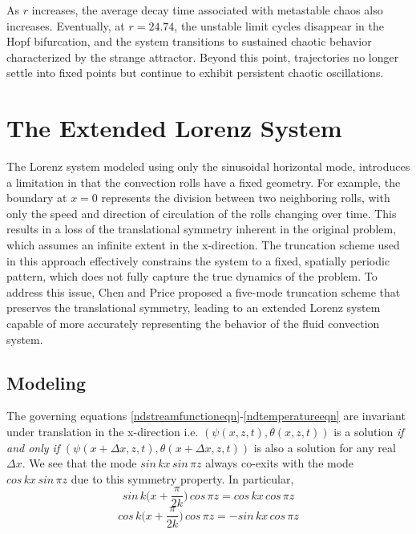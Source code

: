 \documentclass[paper=a4, fontsize=11pt]{scrartcl}
\numberwithin{equation}{section}		%
\numberwithin{figure}{section}			%
\numberwithin{table}{section}				%
\begin{document}
As $r$ increases, the average decay time associated with metastable chaos also increases. Eventually, at $r=24.74$, the unstable limit cycles disappear in the Hopf bifurcation, and the system transitions to sustained chaotic behavior characterized by the strange attractor. Beyond this point, trajectories no longer settle into fixed points but continue to exhibit persistent chaotic oscillations.

\section{The Extended Lorenz System}
The Lorenz system modeled using only the sinusoidal horizontal mode, introduces a limitation in that the convection rolls have a fixed geometry. For example, the boundary at $x=0$ represents the division between two neighboring rolls, with only the speed and direction of circulation of the rolls changing over time. This results in a loss of the translational symmetry inherent in the original problem, which assumes an infinite extent in the x-direction. The truncation scheme used in this approach effectively constrains the system to a fixed, spatially periodic pattern, which does not fully capture the true dynamics of the problem. To address this issue, Chen and Price \cite{chen2006} proposed a five-mode truncation scheme that preserves the translational symmetry, leading to an extended Lorenz system capable of more accurately representing the behavior of the fluid convection system.

\subsection{Modeling}
The governing equations \ref{ndstreamfunctioneqn}-\ref{ndtemperatureeqn} are invariant under translation in the x-direction i.e. $(\psi(x,z,t),\theta(x,z,t))$ is a solution \textit{if and only if} $(\psi(x+\Delta x,z,t),\theta(x+\Delta x,z,t))$ is also a solution for any real $\Delta x$. We see that the mode $sin \, kx  \, sin \, \pi z$ always co-exits with the mode $cos \, kx  \, sin \, \pi z$ due to this symmetry property. In particular, 
\begin{equation}
	sin \, k\biggl(x + \frac{\pi}{2k}\biggr) \, cos \, \pi z = cos \, kx \, cos \, \pi z 
\end{equation}
\begin{equation}
	cos \, k\biggl(x + \frac{\pi}{2k}\biggr) \, cos \, \pi z = - sin \, kx \, cos \, \pi z 
\end{equation}
\end{document}
